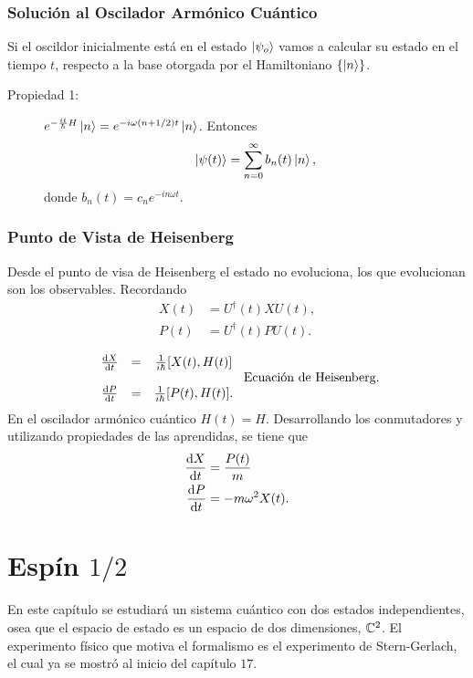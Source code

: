 \subsection{Solución al Oscilador Armónico Cuántico}
Si el oscildor inicialmente está en el estado $\ket{\psi_{o} }$ vamos a calcular su estado en el tiempo $t$, respecto a la base otorgada por el Hamiltoniano $\{ \ket{n} \}$.

\begin{description}
	\item[Propiedad 1: ] $e^{-\frac{it}{\hbar} H} \ket{n} = e^{-i\omega (n + 1/2) t} \ket{n}$. Entonces
		$$ \ket{\psi (t)} = \sum _{n = 0} ^\infty b_n (t) \ket{n}, $$
	donde $b_n (t) = c_n e^{-in\omega t}$.
\end{description}



\subsection{Punto de Vista de Heisenberg}
Desde el punto de visa de Heisenberg el estado no evoluciona, los que evolucionan son los observables. Recordando 
	\begin{align*}
		X(t) &= U^\dagger (t) X U(t), \\
		P(t) &= U^\dagger (t) P U(t).
	\end{align*}

	\begin{align}
		\begin{array}{ccc}
			\dv{X}{t} & = & \frac{1}{i\hbar} [X(t) ,H(t)] \\
			 & & \\
			\dv{P}{t} & = & \frac{1}{i\hbar} [P(t) ,H(t)].
		\end{array} \text{ Ecuación de Heisenberg.}
	\end{align}
En el oscilador armónico cuántico $H(t) = H$. Desarrollando los conmutadores y utilizando propiedades de las aprendidas, se tiene que
	\begin{align}
		\dv{X}{t} &= \frac{P(t)}{m} \\
		\dv{P}{t} &= -m\omega ^2 X(t).
	\end{align}













\chapter{Espín $1/2$}
En este capítulo se estudiará un sistema cuántico con dos estados independientes, osea que el espacio de estado es un espacio de dos dimensiones, $\mathbb{C} ^2$. El experimento físico que motiva el formalismo es el experimento de Stern-Gerlach, el cual ya se mostró al inicio del capítulo $17$. 

